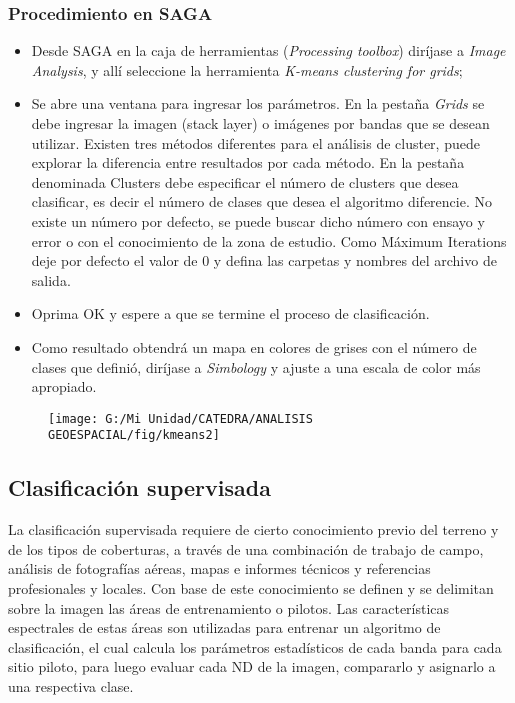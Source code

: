 \documentclass[a4paper,oneside,11pt,]{article}
\begin{document}
\subsubsection{Procedimiento en SAGA}

\begin{itemize}
\item Desde SAGA en la caja de herramientas (\emph{Processing toolbox}) diríjase a \emph{Image Analysis}, y allí seleccione la herramienta \emph{K-means clustering for grids}; 
\item Se abre una ventana para ingresar los parámetros. En la pestaña \emph{Grids} se debe ingresar la imagen (stack layer) o imágenes por bandas que se desean utilizar. Existen tres métodos diferentes para el análisis de cluster, puede explorar la diferencia entre resultados por cada método. En la pestaña denominada Clusters debe especificar el número de clusters que desea clasificar, es decir el número de clases que desea el algoritmo diferencie. No existe un número por defecto, se puede buscar dicho número con ensayo y error o con el conocimiento de la zona de estudio. Como Máximum Iterations deje por defecto el valor de 0 y defina las carpetas y nombres del archivo de salida.
\item Oprima OK y espere a que se termine el proceso de clasificación.
\item Como resultado obtendrá un mapa en colores de grises con el número de clases que definió, diríjase a \emph{Simbology} y ajuste a una escala de color más apropiado.
\end{itemize}

\begin{figure}
\centering
\texttt{[image: G:/Mi Unidad/CATEDRA/ANALISIS GEOESPACIAL/fig/kmeans2]}
\end{figure}

\subsection{Clasificación supervisada}

La clasificación supervisada requiere de cierto conocimiento previo del terreno y de los tipos de coberturas, a través de una combinación de trabajo de campo, análisis de fotografías aéreas, mapas e informes técnicos y referencias profesionales y locales. Con base de este conocimiento se definen y se delimitan sobre la imagen las áreas de entrenamiento o pilotos. Las características espectrales de estas áreas son utilizadas para entrenar un algoritmo de clasificación, el cual calcula los parámetros estadísticos de cada banda para cada sitio piloto, para luego evaluar cada ND de la imagen, compararlo y asignarlo a una respectiva clase.
\end{document}
